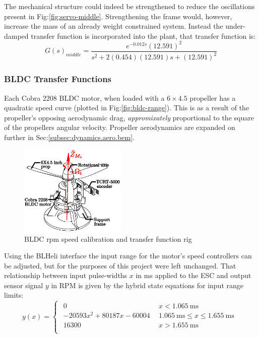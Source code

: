\par
The mechanical structure could indeed be strengthened to reduce the oscillations present in Fig:\ref{fig:servo-middle}. Strengthening the frame would, however, increase the mass of an already weight constrained system. Instead the under-damped transfer function is incorporated into the plant, that transfer function is:
\begin{equation}\label{eq:servo-transfer-middle}
G(s)_{middle}=\frac{e^{-0.012s}(12.591)^2}{s^2+2(0.454)(12.591)s+(12.591)^2}
\end{equation}
\subsubsection*{BLDC Transfer Functions}
Each Cobra 2208 BLDC motor, when loaded with a $6\times4.5$ propeller has a quadratic speed curve (plotted in Fig:\ref{fig:bldc-range}). This is as a result of the propeller's opposing aerodynamic drag, \emph{appromixately} proportional to the square of the propellers angular velocity. Propeller aerodynamics are expanded on further in Sec:\ref{subsec:dynamics.aero.bem}.
\begin{figure}[htbp]
\centering
\includegraphics[width=0.45\textwidth]{figs/bldc-rpm}
\caption{BLDC rpm speed calibration and transfer function rig}
\label{fig:bldc-rpm}
\vspace{-16pt}
\end{figure}
\par
Using the BLHeli interface the input range for the motor's speed controllers can be adjusted, but for the purposes of this project were left unchanged. That relationship between input pulse-widths $x$ in ms applied to the ESC and output sensor signal $y$ in RPM is given by the hybrid state equations for input range limits:
\begin{equation}
y(x)=
\begin{cases}\begin{array}{ll}
0 & ~~x<1.065~\text{ms}\\
-20593x^2 + 80187x - 60004 & ~~1.065~\text{ms} \leq x \leq 1.655~\text{ms}\\
16300 & ~~x>1.655~\text{ms}\\
\end{array}
\end{cases}
\label{eq:bldc-range}
\end{equation}
